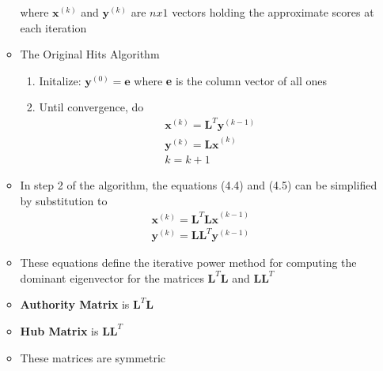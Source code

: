 \documentclass[11pt]{report}
\begin{document}
\begin{itemize}
\begin{itemize}
\begin{equation}
\end{equation} where \(\textbf{x}^{(k)}\) and \(\textbf{y}^{(k)}\) are \(\textit{n}x1\) vectors holding the approximate scores at each iteration
\item The Original Hits Algorithm
\begin{enumerate}
\item Initalize: \(\textbf{y}^{(0)}=\textbf{e} \) where \textbf{e} is the column vector of all ones
\item Until convergence, do \begin{eqnarray}
\textbf{x}^{(k)} =\textbf{L}^T\textbf{y}^{(k-1)}\\
\textbf{y}^{(k)} =\textbf{Lx}^{(k)}\\
k=k+1
\end{eqnarray}
\end{enumerate}
\item In step 2 of the algorithm, the equations (4.4) and (4.5) can be simplified by substitution to \begin{eqnarray}
\textbf{x}^{(k)} = \textbf{L}^T\textbf{Lx}^{(k-1)}\\ \textbf{y}^{(k)}=\textbf{LL}^T\textbf{y}^{(k-1)}
\end{eqnarray}
\item These equations define the iterative power method for computing the dominant eigenvector for the matrices $\textbf{L}^T\textbf{L}$ and $\textbf{LL}^T$
\item \textbf{Authority Matrix} is $\textbf{L}^T\textbf{L}$
\item \textbf{Hub Matrix} is $\textbf{LL}^T$
\item These matrices are symmetric
\end{itemize}
\end{itemize}
\end{document}
